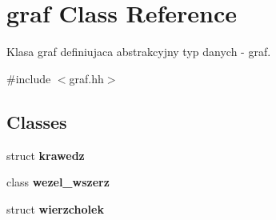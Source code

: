\hypertarget{classgraf}{\section{graf \-Class \-Reference}
\label{classgraf}
}


\-Klasa graf definiujaca abstrakcyjny typ danych -\/ graf.  




{\ttfamily \#include $<$graf.\-hh$>$}

\subsection*{\-Classes}
\begin{DoxyCompactItemize}
\item 
struct {\bfseries krawedz}
\item 
class {\bfseries wezel\-\_\-wszerz}
\item 
struct {\bfseries wierzcholek}
\end{DoxyCompactItemize}
